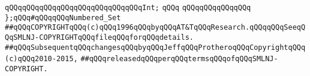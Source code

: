 \verb|qQQqqQQqqQQqqQQqqQQqqQQqqQQqqQQqInt;|\newline
\verb|qQQq|\newline
\verb|qQQqqQQqqQQqqQQq|\newline
\newline
\verb|};qQQq#qQQqqQQqNumbered_Set|\newline
\newline
\newline
\verb|##qQQqCOPYRIGHTqQQq(c)qQQq1996qQQqbyqQQqAT&TqQQqResearch.qQQqqQQqSeeqQQqSMLNJ-COPYRIGHTqQQqfileqQQqforqQQqdetails.|\newline
\verb|##qQQqSubsequentqQQqchangesqQQqbyqQQqJeffqQQqProtheroqQQqCopyrightqQQq(c)qQQq2010-2015,|\newline
\verb|##qQQqreleasedqQQqperqQQqtermsqQQqofqQQqSMLNJ-COPYRIGHT.|\newline

